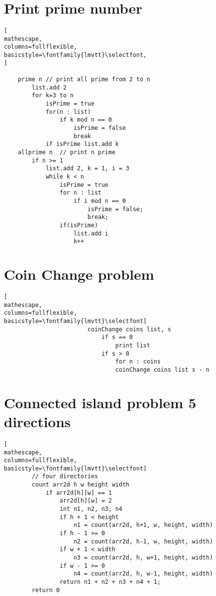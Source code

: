 \documentclass{article}
\begin{document}
\section{Print prime number}
\begin{lstlisting}[
mathescape,
columns=fullflexible,
basicstyle=\fontfamily{lmvtt}\selectfont,
]
    
    prime n // print all prime from 2 to n
        list.add 2
        for k=3 to n
            isPrime = true
            for(n : list)
                if k mod n == 0 
                    isPrime = false
                    break
            if isPrime list.add k
    allprime n  // print n prime
        if n >= 1
            list.add 2, k = 1, i = 3
            while k < n
                isPrime = true
                for n : list 
                    if i mod n == 0
                        isPrime = false;
                        break;
                if(isPrime)
                    list.add i 
                    k++
\end{lstlisting} 

\pagebreak
\section{Coin Change problem}
\begin{lstlisting}[
mathescape,
columns=fullflexible,
basicstyle=\fontfamily{lmvtt}\selectfont]
                        coinChange coins list, s 
                            if s == 0
                                print list
                            if s > 0 
                                for n : coins 
                                coinChange coins list s - n
\end{lstlisting} 

\section{Connected island problem 5 directions}
\begin{lstlisting}[
mathescape,
columns=fullflexible,
basicstyle=\fontfamily{lmvtt}\selectfont]
        // four directories
        count arr2d h w height width
            if arr2d[h][w] == 1
                arr2d[h][w] = 2
                int n1, n2, n3, n4
                if h + 1 < height
                    n1 = count(arr2d, h+1, w, height, width)
                if h - 1 >= 0
                    n2 = count(arr2d, h-1, w, height, width)
                if w + 1 < width 
                    n3 = count(arr2d, h, w+1, height, width)
                if w - 1 >= 0 
                    n4 = count(arr2d, h, w-1, height, width)
                return n1 + n2 + n3 + n4 + 1;
        return 0

\end{lstlisting} 
\end{document}
